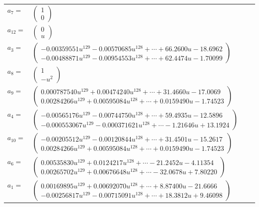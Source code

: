 \documentclass[1p]{elsarticle_modified}
\theoremstyle{definition}
\begin{document}
\begin{tabular}{m{7pt} m{180pt} m{7pt} m{180pt} }
\flushright $a_{7}=$&$\begin{pmatrix}1\\0\end{pmatrix}$ \\
\flushright $a_{12}=$&$\begin{pmatrix}0\\u\end{pmatrix}$ \\
\flushright $a_{3}=$&$\begin{pmatrix}-0.00359551 u^{129}-0.00570685 u^{128}+\cdots+66.2600 u-18.6962\\-0.00488871 u^{129}-0.00954553 u^{128}+\cdots+62.4474 u-1.70099\end{pmatrix}$ \\
\flushright $a_{8}=$&$\begin{pmatrix}1\\- u^2\end{pmatrix}$ \\
\flushright $a_{9}=$&$\begin{pmatrix}0.000787540 u^{129}+0.00474240 u^{128}+\cdots+31.4660 u-17.0069\\0.00284266 u^{129}+0.00595084 u^{128}+\cdots+0.0159490 u-1.74523\end{pmatrix}$ \\
\flushright $a_{4}=$&$\begin{pmatrix}-0.00565176 u^{129}-0.00744750 u^{128}+\cdots+59.4935 u-12.5896\\-0.000553067 u^{129}-0.000371621 u^{128}+\cdots-1.21646 u+13.1924\end{pmatrix}$ \\
\flushright $a_{10}=$&$\begin{pmatrix}-0.00205512 u^{129}-0.00120844 u^{128}+\cdots+31.4501 u-15.2617\\0.00284266 u^{129}+0.00595084 u^{128}+\cdots+0.0159490 u-1.74523\end{pmatrix}$ \\
\flushright $a_{6}=$&$\begin{pmatrix}0.00535830 u^{129}+0.0124217 u^{128}+\cdots-21.2452 u-4.11354\\0.00265702 u^{129}+0.00676648 u^{128}+\cdots-32.0678 u+7.80220\end{pmatrix}$ \\
\flushright $a_{1}=$&$\begin{pmatrix}0.00169895 u^{129}+0.00692070 u^{128}+\cdots+8.87400 u-21.6666\\-0.00256817 u^{129}-0.00715091 u^{128}+\cdots+18.3812 u+9.46098\end{pmatrix}$ \\

\end{tabular}
\end{document}
